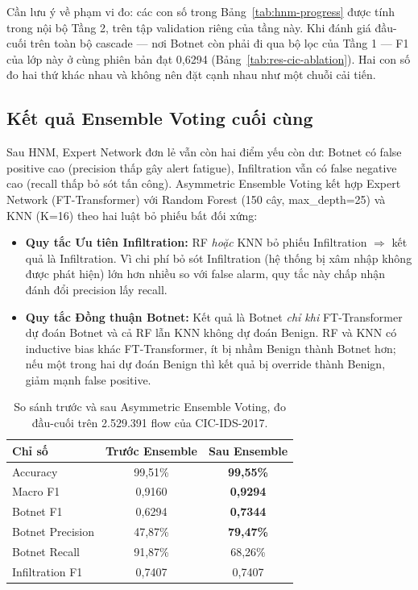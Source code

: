 \documentclass[../DoAn.tex]{subfiles}
\begin{document}
Cần lưu ý về phạm vi đo: các con số trong Bảng~\ref{tab:hnm-progress} được tính trong nội bộ Tầng 2, trên tập validation riêng của tầng này. Khi đánh giá đầu-cuối trên toàn bộ cascade --- nơi Botnet còn phải đi qua bộ lọc của Tầng 1 --- F1 của lớp này ở cùng phiên bản đạt 0,6294 (Bảng~\ref{tab:res-cic-ablation}). Hai con số đo hai thứ khác nhau và không nên đặt cạnh nhau như một chuỗi cải tiến.

\subsection{Kết quả Ensemble Voting cuối cùng}
\label{subsec:tn-cic-ensemble}

Sau HNM, Expert Network đơn lẻ vẫn còn hai điểm yếu còn dư: Botnet có false positive cao (precision thấp gây alert fatigue), Infiltration vẫn có false negative cao (recall thấp bỏ sót tấn công). Asymmetric Ensemble Voting kết hợp Expert Network (FT-Transformer) với Random Forest (150 cây, max\_depth=25) và KNN (K=16) theo hai luật bỏ phiếu bất đối xứng:

\begin{itemize}
    \item \textbf{Quy tắc Ưu tiên Infiltration:} RF \textit{hoặc} KNN bỏ phiếu Infiltration $\Rightarrow$ kết quả là Infiltration. Vì chi phí bỏ sót Infiltration (hệ thống bị xâm nhập không được phát hiện) lớn hơn nhiều so với false alarm, quy tắc này chấp nhận đánh đổi precision lấy recall.
    \item \textbf{Quy tắc Đồng thuận Botnet:} Kết quả là Botnet \textit{chỉ khi} FT-Transformer dự đoán Botnet và cả RF lẫn KNN không dự đoán Benign. RF và KNN có inductive bias khác FT-Transformer, ít bị nhầm Benign thành Botnet hơn; nếu một trong hai dự đoán Benign thì kết quả bị override thành Benign, giảm mạnh false positive.
\end{itemize}

\begin{table}[H]
    \centering
    \caption{So sánh trước và sau Asymmetric Ensemble Voting, đo đầu-cuối trên 2.529.391 flow của CIC-IDS-2017.}
    \label{tab:cic-final-compare}
    \begin{tabular}{lcc}
        \hline
        \textbf{Chỉ số} & \textbf{Trước Ensemble} & \textbf{Sau Ensemble} \\
        \hline
        Accuracy             & 99,51\%  & \textbf{99,55\%} \\
        Macro F1             & 0,9160   & \textbf{0,9294} \\
        Botnet F1            & 0,6294   & \textbf{0,7344} \\
        \quad Botnet Precision & 47,87\%  & \textbf{79,47\%} \\
        \quad Botnet Recall    & 91,87\%  & 68,26\% \\
        Infiltration F1      & 0,7407   & 0,7407 \\
        \hline
    \end{tabular}
\end{table}
\end{document}
